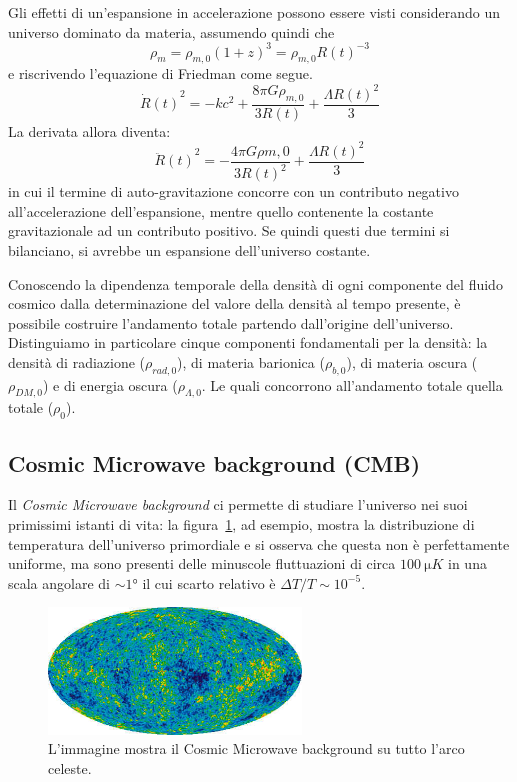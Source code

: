 Gli effetti di un'espansione in accelerazione possono essere visti considerando un universo dominato da materia, assumendo quindi che
\[
    \rho_{m} = \rho_{m, 0}{(1+z)}^3 = \rho_{m,0}{R(t)}^{-3}
\]
e riscrivendo l'equazione di Friedman come segue.
\[
    {\dot{R}(t)}^2 = - kc^2 + \frac{8\pi G \rho_{m,0}}{3R(t)} + \frac{\Lambda {R(t)}^2}{3}
\]
La derivata allora diventa:
\[
    {\ddot{R}(t)}^2 = -\frac{4\pi G \rho{m,0}}{3{R(t)}^2}+ \frac{\Lambda {R(t)}^2}{3}
\]
in cui il termine di auto-gravitazione concorre con un contributo negativo all'accelerazione dell'espansione, mentre quello contenente la costante gravitazionale ad un contributo positivo. Se quindi questi due termini si bilanciano, si avrebbe un espansione dell'universo costante.

Conoscendo la dipendenza temporale della densità di ogni componente del fluido cosmico dalla determinazione del valore della densità al tempo presente, è possibile costruire l'andamento totale partendo dall'origine dell'universo. Distinguiamo in particolare cinque componenti fondamentali per la densità: la densità di radiazione ($\rho_{rad, 0}$), di materia barionica ($\rho_{b, 0}$), di materia oscura ($\rho_{DM, 0}$) e di energia oscura ($\rho_{\Lambda, 0}$. Le quali concorrono all'andamento totale quella totale ($\rho_{0}$).

\subsection{Cosmic Microwave background (CMB)}\label{sec:CMB}
Il \textit{Cosmic Microwave background} ci permette di studiare l'universo nei suoi primissimi istanti di vita: la figura~\ref{fig:CMB1}, ad esempio, mostra la distribuzione di temperatura dell'universo primordiale e si osserva che questa non è perfettamente uniforme, ma sono presenti delle minuscole fluttuazioni di circa $\SI{100}{\micro K}$ in una scala angolare di $\sim 1\si{\degree}$ il cui scarto relativo è $\Delta T/T \sim 10^{-5}$.
\begin{figure}
    \centering
    \includegraphics[width = 0.6\textwidth]{immagini/CMB1.jpg}
    \caption{L'immagine mostra il Cosmic Microwave background su tutto l'arco celeste.}\label{fig:CMB1}
\end{figure}

